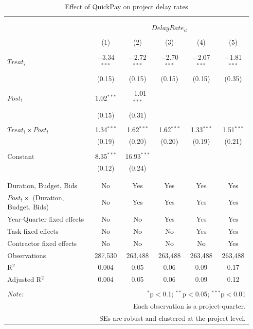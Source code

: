 \documentclass[
]{article}
\begin{document}
\begin{table}[H] \centering 
  \caption{Effect of QuickPay on project delay rates} 
  \label{} 
\small 
\begin{tabular}{@{\extracolsep{-2pt}}lccccc} 
\\[-1.8ex]\hline 
\hline \\[-1.8ex] 
\\[-1.8ex] & \multicolumn{5}{c}{$DelayRate_{it}$} \\ 
\\[-1.8ex] & (1) & (2) & (3) & (4) & (5)\\ 
\hline \\[-1.8ex] 
 $Treat_i$ & $-$3.34$^{***}$ & $-$2.72$^{***}$ & $-$2.70$^{***}$ & $-$2.07$^{***}$ & $-$1.81$^{***}$ \\ 
  & (0.15) & (0.15) & (0.15) & (0.15) & (0.35) \\ 
  & & & & & \\ 
 $Post_t$ & 1.02$^{***}$ & $-$1.01$^{***}$ &  &  &  \\ 
  & (0.15) & (0.31) &  &  &  \\ 
  & & & & & \\ 
 $Treat_i \times Post_t$ & 1.34$^{***}$ & 1.62$^{***}$ & 1.62$^{***}$ & 1.33$^{***}$ & 1.51$^{***}$ \\ 
  & (0.19) & (0.20) & (0.20) & (0.19) & (0.21) \\ 
  & & & & & \\ 
 Constant & 8.35$^{***}$ & 16.93$^{***}$ &  &  &  \\ 
  & (0.12) & (0.24) &  &  &  \\ 
  & & & & & \\ 
\hline \\[-1.8ex] 
Duration, Budget, Bids & No & Yes & Yes & Yes & Yes \\ 
$Post_t \times$  (Duration, Budget, Bids) & No & Yes & Yes & Yes & Yes \\ 
Year-Quarter fixed effects & No & No & Yes & Yes & Yes \\ 
Task fixed effects & No & No & No & Yes & Yes \\ 
Contractor fixed effects & No & No & No & No & Yes \\ 
Observations & 287,530 & 263,488 & 263,488 & 263,488 & 263,488 \\ 
R$^{2}$ & 0.004 & 0.05 & 0.06 & 0.09 & 0.17 \\ 
Adjusted R$^{2}$ & 0.004 & 0.05 & 0.06 & 0.09 & 0.12 \\ 
\hline 
\hline \\[-1.8ex] 
\textit{Note:}  & \multicolumn{5}{r}{$^{*}$p$<$0.1; $^{**}$p$<$0.05; $^{***}$p$<$0.01} \\ 
 & \multicolumn{5}{r}{Each observation is a project-quarter.} \\ 
 & \multicolumn{5}{r}{SEs are robust and clustered at the project level.} \\ 
\end{tabular} 
\end{table}
\end{document}
